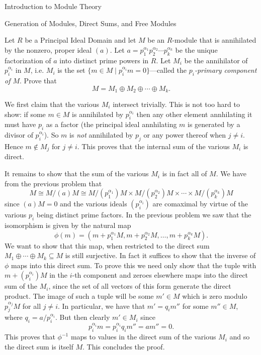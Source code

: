 \begin{chapter}{Introduction to Module Theory}
\begin{section}{Generation of Modules, Direct Sums, and Free Modules}
\begin{problem}\label{ex:10.3.18}
Let $R$ be a Principal Ideal Domain and let $M$ be an $R$-module that is annihilated by the nonzero, proper ideal $(a)$. Let $a = p_1^{\alpha_1}p_2^{\alpha_2}\cdots p_k^{\alpha_k}$ be the unique factorization of $a$ into distinct prime powers in $R$. Let $M_i$ be the annihilator of $p_i^{\alpha_i}$ in $M$, i.e. $M_i$ is the set $\{m\in M\mid p_i^{\alpha_i}m = 0\}$---called the \emph{$p_i$-primary component of $M$}. Prove that \[
M = M_1\oplus M_2\oplus \cdots \oplus M_k.
\]
\end{problem}
\begin{solution}
 We first claim that the various $M_i$ intersect trivially. This is not too hard to show: if some $m\in M$ is annihilated by $p_i^{\alpha_i}$ then any other element annhilating it must have $p_i$ as a factor (the principal ideal annhilating $m$ is generated by a divisor of $p_i^{\alpha_i}$). So $m$ is \emph{not} annihilated by $p_j$ or any power thereof when $j\neq i$. Hence $m\notin M_j$ for $j\neq i$. This proves that the internal sum of the various $M_i$ is direct. 

It remains to show that the sum of the various $M_i$ is in fact all of $M$. We have from the previous problem that \[
M\cong M/(a)M \cong M/(p_1^{\alpha_1})M \times M/(p_2^{\alpha_2})M\times\cdots\times M/(p_k^{\alpha_k})M
\]
since $(a)M = 0$ and the various ideals $(p_i^{\alpha_i})$ are comaximal by virtue of the various $p_i$ being distinct prime factors. In the previous problem we saw that the isomorphism is given by the natural map \[\phi(m) = (m+p_1^{\alpha_1}M, m+p_2^{\alpha_2}M,\ldots, m+p_k^{\alpha_k}M).\]
We want to show that this map, when restricted to the direct sum $M_1\oplus\cdots \oplus M_k\subseteq M$ is still surjective. In fact it suffices to show that the inverse of $\phi$ maps into this direct sum. To prove this we need only show that the tuple with $m+(p_i^{\alpha_i})M$ in the $i$-th component and zeroes elsewhere maps into the direct sum of the $M_i$, since the set of all vectors of this form generate the direct product. The image of such a tuple will be some $m'\in M$ which is zero modulo $p_j^{\alpha_j}M$ for all $j\neq i$. In particular, we have that $m' =q_i m''$ for some $m''\in M$, where $q_i = a/p_i^{\alpha_i}$. But then clearly $m'\in M_i$ since \[
p_i^{\alpha_i} m = p_i^{\alpha_i}q_i m'' = am'' = 0.
\]
This proves that $\phi^{-1}$ maps to values in the direct sum of the various $M_i$ and so the direct sum is itself $M$. This concludes the proof.


\end{solution}
\end{section}
\end{chapter}
